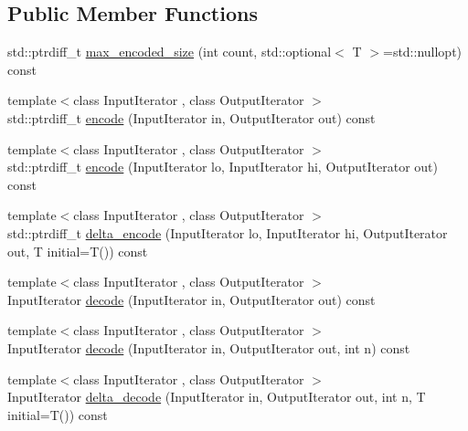 \subsection*{Public Member Functions}
\begin{DoxyCompactItemize}
\item 
std\+::ptrdiff\+\_\+t \mbox{\hyperlink{structirk_1_1vbyte__codec_aaccf33b7ad6ed3b848550d18e9f4b4fd}{max\+\_\+encoded\+\_\+size}} (int count, std\+::optional$<$ T $>$=std\+::nullopt) const
\item 
{\footnotesize template$<$class Input\+Iterator , class Output\+Iterator $>$ }\\std\+::ptrdiff\+\_\+t \mbox{\hyperlink{structirk_1_1vbyte__codec_a5025310850ce7856699773f082f71c3a}{encode}} (Input\+Iterator in, Output\+Iterator out) const
\item 
{\footnotesize template$<$class Input\+Iterator , class Output\+Iterator $>$ }\\std\+::ptrdiff\+\_\+t \mbox{\hyperlink{structirk_1_1vbyte__codec_a8d8f0f48198257165cbfe17bb8e0a7f1}{encode}} (Input\+Iterator lo, Input\+Iterator hi, Output\+Iterator out) const
\item 
{\footnotesize template$<$class Input\+Iterator , class Output\+Iterator $>$ }\\std\+::ptrdiff\+\_\+t \mbox{\hyperlink{structirk_1_1vbyte__codec_a233660cc818ce569c0a0118ce74d46f2}{delta\+\_\+encode}} (Input\+Iterator lo, Input\+Iterator hi, Output\+Iterator out, T initial=T()) const
\item 
{\footnotesize template$<$class Input\+Iterator , class Output\+Iterator $>$ }\\Input\+Iterator \mbox{\hyperlink{structirk_1_1vbyte__codec_a5de271838b06bde6458d12d417d570c9}{decode}} (Input\+Iterator in, Output\+Iterator out) const
\item 
{\footnotesize template$<$class Input\+Iterator , class Output\+Iterator $>$ }\\Input\+Iterator \mbox{\hyperlink{structirk_1_1vbyte__codec_ac294eeea42950c214f56dc03953a3420}{decode}} (Input\+Iterator in, Output\+Iterator out, int n) const
\item 
{\footnotesize template$<$class Input\+Iterator , class Output\+Iterator $>$ }\\Input\+Iterator \mbox{\hyperlink{structirk_1_1vbyte__codec_ad0773adf36a31bc8ad7cf98baf6f7721}{delta\+\_\+decode}} (Input\+Iterator in, Output\+Iterator out, int n, T initial=T()) const
\end{DoxyCompactItemize}
